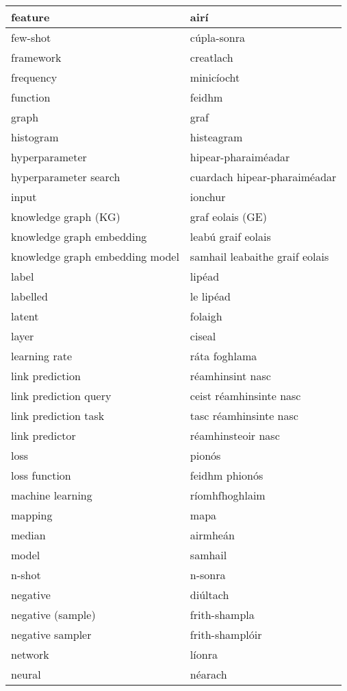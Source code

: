 \documentclass{article}
\begin{document}
\begin{longtable}{|l|l|}
		feature&airí\\ \hline 
		few-shot&cúpla-sonra\\ \hline 
		framework&creatlach\\ \hline 
		frequency&minicíocht\\ \hline 
		function&feidhm\\ \hline 
		graph&graf\\ \hline 
		histogram&histeagram\\ \hline 
		hyperparameter&hipear-pharaiméadar\\ \hline 
		hyperparameter search&cuardach hipear-pharaiméadar\\ \hline 
		input&ionchur\\ \hline 
		knowledge graph (KG)&graf eolais (GE)\\ \hline 
		knowledge graph embedding&leabú graif eolais\\ \hline 
		knowledge graph embedding model&samhail leabaithe graif eolais\\ \hline 
		label&lipéad\\ \hline 
		labelled&le lipéad\\ \hline 
		latent&folaigh\\ \hline 
		layer&ciseal\\ \hline 
		learning rate&ráta foghlama\\ \hline 
		link prediction&réamhinsint nasc\\ \hline 
		link prediction query&ceist réamhinsinte nasc\\ \hline 
		link prediction task&tasc réamhinsinte nasc\\ \hline 
		link predictor&réamhinsteoir nasc\\ \hline 
		loss&pionós\\ \hline 
		loss function&feidhm phionós\\ \hline 
		machine learning&ríomhfhoghlaim\\ \hline 
		mapping&mapa\\ \hline 
		median&airmheán\\ \hline 
		model&samhail\\ \hline 
		n-shot&n-sonra\\ \hline 
		negative&diúltach\\ \hline 
		negative (sample)&frith-shampla\\ \hline 
		negative sampler&frith-shamplóir\\ \hline 
		network&líonra\\ \hline 
		neural&néarach\\ \hline 

\end{longtable}
\end{document}

